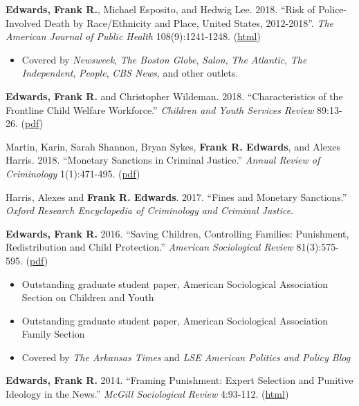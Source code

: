 \documentclass[margin,line]{res}
\begin{document}
\begin{resume}
\textbf{Edwards, Frank R.}, Michael Esposito, and Hedwig Lee. 2018. ``Risk of Police-Involved Death by Race/Ethnicity and Place, United States, 2012-2018''. \textit{The American Journal of Public Health} 108(9):1241-1248. (\href{https://ajph.aphapublications.org/doi/10.2105/AJPH.2018.304559}{html})

\begin{itemize}
  \item Covered by \textit{Newsweek}, \textit{The Boston Globe}, \textit{Salon}, \textit{The Atlantic}, \textit{The Independent}, \textit{People}, \textit{CBS News}, and other outlets.
\end{itemize}

\textbf{Edwards, Frank R.} and Christopher Wildeman. 2018. ``Characteristics of the Frontline Child Welfare Workforce.'' \textit{Children and Youth Services Review} 89:13-26. (\href{https://osf.io/a86td/}{pdf})

Martin, Karin, Sarah Shannon, Bryan Sykes, \textbf{Frank R. Edwards}, and Alexes Harris. 2018. ``Monetary Sanctions in Criminal Justice.'' \textit{Annual Review of Criminology} 1(1):471-495. (\href{http://frankedwards.net/wp-content/uploads/2018/01/annurev-criminol-032317-091915.pdf}{pdf})

Harris, Alexes and \textbf{Frank R. Edwards}. 2017. ``Fines and Monetary Sanctions.'' \textit{Oxford Research Encyclopedia of Criminology and Criminal Justice}. 

\textbf{Edwards, Frank R.} 2016. ``Saving Children, Controlling Families: Punishment, Redistribution and Child Protection.'' \textit{American Sociological Review} 81(3):575-595. (\href{http://frankedwards.net/wp-content/uploads/2016/03/savingchildren.pdf}{pdf})

\begin{itemize}
  \item Outstanding graduate student paper, American Sociological Association Section on Children and Youth
  \item Outstanding graduate student paper, American Sociological Association Family Section
  \item Covered by \textit{The Arkansas Times} and \textit{LSE American Politics and Policy Blog}
\end{itemize}

\textbf{Edwards, Frank R.} 2014. ``Framing Punishment: Expert Selection and Punitive Ideology in the News.'' \textit{McGill Sociological Review} 4:93-112. (\href{https://www.mcgill.ca/msr/msr-volume-4/framing-punishment}{html}) 


\end{resume}
\end{document}

